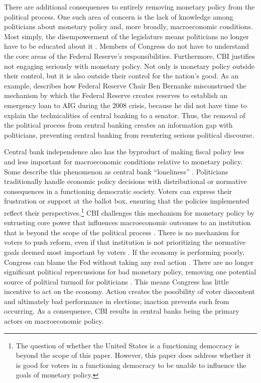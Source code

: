 \documentclass[12pt,a4paper]{article}
\begin{document}
\begin{doublespace}
There are additional consequences to entirely removing monetary policy from the political process. One such area of concern is the lack of knowledge among politicians about monetary policy and, more broadly, macroeconomic conditions. Most simply, the disempowerment of the legislature means politicians no longer have to be educated about it \parencite{downey_our_2025}. Members of Congress do not have to understand the core areas of the Federal Reserve's responsibilities. Furthermore, CBI justifies not engaging seriously with monetary policy. Not only is monetary policy outside their control, but it is also outside their control for the nation's good. As an example, \textcite{bernanke_courage_2017} describes how Federal Reserve Chair Ben Bernanke misconstrued the mechanism by which the Federal Reserve creates reserves to establish an emergency loan to AIG during the 2008 crisis, because he did not have time to explain the technicalities of central banking to a senator. Thus, the removal of the political process from central banking creates an information gap with politicians, preventing central banking from reentering serious political discourse. 

Central bank independence also has the byproduct of making fiscal policy less and less important for macroeconomic conditions relative to monetary policy. Some describe this phenomenon as central bank ``loneliness'' \parencite{mabbett_independent_2019}. Politicians traditionally handle economic policy decisions with distributional or normative consequences in a functioning democratic society. Voters can express their frustration or support at the ballot box, ensuring that the policies implemented reflect their perspectives.\footnote{The question of whether the United States is a functioning democracy is beyond the scope of this paper. However, this paper does address whether it is good for voters in a functioning democracy to be unable to influence the goals of monetary policy.} CBI challenges this mechanism for monetary policy by entrusting core power that influences macroeconomic outcomes to an institution that is beyond the scope of the political process \parencite{hopkin_global_2019}. There is no mechanism for voters to push reform, even if that institution is not prioritizing the normative goals deemed most important by voters \parencite{woodruff_democratize_2019}. If the economy is performing poorly, Congress can blame the Fed without taking any real action \parencite{mabbett_independent_2019}. There are no longer significant political repercussions for bad monetary policy, removing one potential source of political turmoil for politicians \parencite{woodruff_democratize_2019}. This means Congress has little incentive to act on the economy. Action creates the possibility of voter discontent and ultimately bad performance in elections; inaction prevents such from occurring. As a consequence, CBI results in central banks being the primary actors on macroeconomic policy.




\end{doublespace}
\end{document}

